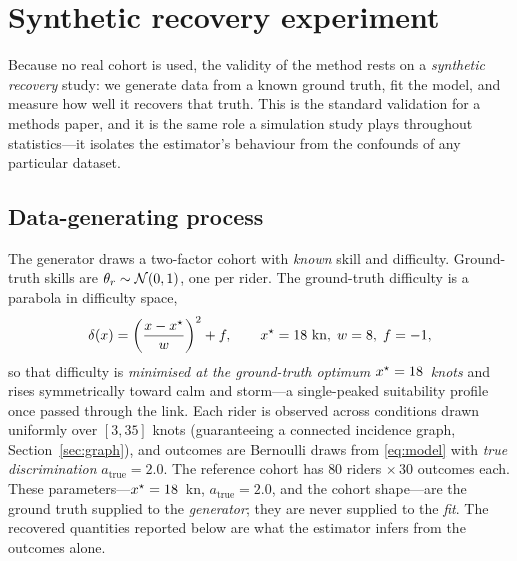 \section{Synthetic recovery experiment}
\label{sec:recovery}



Because no real cohort is used, the validity of the method rests on a
\emph{synthetic recovery} study: we generate data from a known ground truth, fit
the model, and measure how well it recovers that truth. This is the standard
validation for a methods paper, and it is the same role a simulation study plays
throughout statistics---it isolates the estimator's behaviour from the confounds
of any particular dataset.

\subsection{Data-generating process}
\label{sec:dgp}

The generator draws a two-factor cohort with \emph{known} skill and difficulty.
Ground-truth skills are $\theta_r \sim \mathcal{N}(0,1)$, one per rider. The
ground-truth difficulty is a parabola in difficulty space,
\begin{equation}
  \label{eq:dgp-delta}
  \delta(x) = \left(\frac{x - x^\star}{w}\right)^{2} + f,
  \qquad x^\star = 18~\text{kn},\; w = 8,\; f = -1,
\end{equation}
so that difficulty is \emph{minimised at the ground-truth optimum
$x^\star = 18$~knots} and rises symmetrically toward calm and storm---a
single-peaked suitability profile once passed through the link. Each rider is
observed across conditions drawn uniformly over $[3, 35]$ knots (guaranteeing a
connected incidence graph, Section~\ref{sec:graph}), and outcomes are Bernoulli
draws from \eqref{eq:model} with \emph{true discrimination}
$a_{\text{true}} = 2.0$. The reference cohort has $80$ riders $\times\,30$
outcomes each. These parameters---$x^\star = 18$~kn, $a_{\text{true}} = 2.0$,
and the cohort shape---are the ground truth supplied to the \emph{generator};
they are never supplied to the \emph{fit}. The recovered quantities reported below
are what the estimator infers from the outcomes alone.

